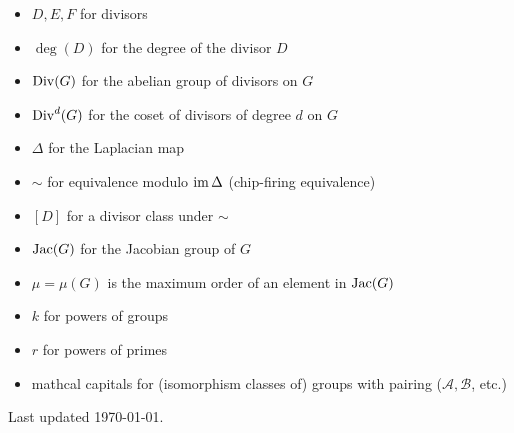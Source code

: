 \documentclass{amsart}
\begin{document}
\begin{itemize}
\item $D,E,F$ for divisors
\item $\deg(D)$ for the degree of the divisor $D$
\item $\operatorname{Div}(G)$ for the abelian group of divisors on $G$
\item $\operatorname{Div}^d(G)$ for the coset of divisors of degree $d$ on $G$
\item $\Delta$ for the Laplacian map
\item $\sim$ for equivalence modulo $\operatorname{im}\Delta$ (chip-firing equivalence)
\item $[D]$ for a divisor class under $\sim$
\item $\operatorname{Jac}(G)$ for the Jacobian group of $G$
\item $\mu=\mu(G)$ is the maximum order of an element in $\operatorname{Jac}(G)$

\item $k$ for powers of groups
\item $r$ for powers of primes
\item mathcal capitals for (isomorphism classes of) groups with pairing ($\mathcal{A},\mathcal{B}$, etc.)

\end{itemize}

\vspace{1cm} Last updated \today.
\end{document}
